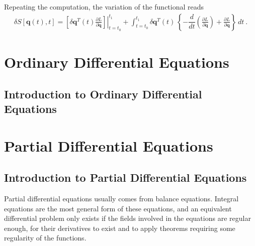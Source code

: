 \documentclass[letterpaper,10pt,english]{jupyterBook}
\begin{document}
\sphinxAtStartPar
Repeating the computation, the variation of the functional reads
\begin{equation*}
\begin{split}\delta S[\mathbf{q}(t), t] = \left.\left[ \delta \mathbf{q}^T(t) \frac{\partial L}{\partial \dot{\mathbf{q}}} \right]\right|_{t=t_0}^{t_1} + \int_{t = t_0}^{t_1} \delta \mathbf{q}^T(t) \, \left\{ - \dfrac{d}{dt} \left( \frac{\partial L}{\partial \dot{\mathbf{q}}} \right) + \frac{\partial L}{\partial \mathbf{q}} \right\} \, dt \ .\end{split}
\end{equation*}
\sphinxAtStartPar
{}



\sphinxstepscope


\part{Ordinary Differential Equations}

\sphinxstepscope


\chapter{Introduction to Ordinary Differential Equations}
\label{\detokenize{ch/ode/intro:introduction-to-ordinary-differential-equations}}\label{\detokenize{ch/ode/intro:ode}}\label{\detokenize{ch/ode/intro::doc}}
\sphinxstepscope


\part{Partial Differential Equations}

\sphinxstepscope


\chapter{Introduction to Partial Differential Equations}
\label{\detokenize{ch/pde/intro:introduction-to-partial-differential-equations}}\label{\detokenize{ch/pde/intro:pde}}\label{\detokenize{ch/pde/intro::doc}}
\sphinxAtStartPar
Partial differential equations usually comes from balance equations. Integral equations are the most general form of these equations, and an equivalent differential problem only exists if the fields involved in the equations are regular enough, for their derivatives to exist \sphinxhyphen{} and to apply theorems requiring some regularity of the functions.
\end{document}
